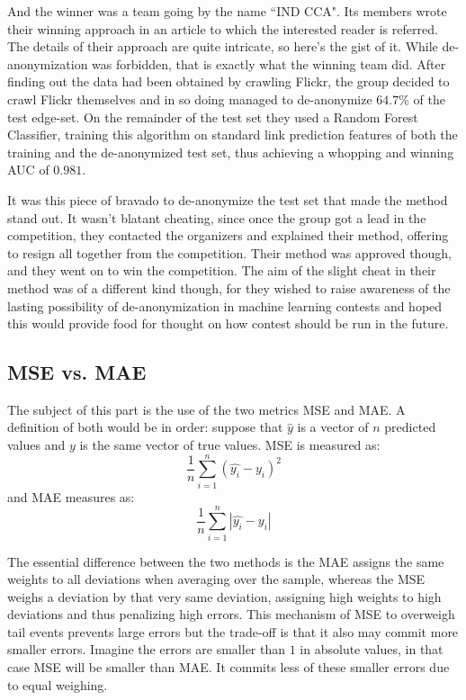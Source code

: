 \documentclass[english, a4paper]{article}
\begin{document}
And the winner was a team going by the name ``IND CCA". Its members wrote their winning approach in an article \cite{6033446} to which the interested reader is referred. The details of their approach are quite intricate, so here's the gist of it. While de-anonymization was forbidden, that is exactly what the winning team did. After finding out the data had been obtained by crawling Flickr, the group decided to crawl Flickr themselves and in so doing managed to de-anonymize $64.7 \%$ of the test edge-set. On the remainder of the test set they used a Random Forest Classifier, training this algorithm on standard link prediction features of both the training and the de-anonymized test set, thus achieving a whopping and winning AUC of $0.981$.

It was this piece of bravado to de-anonymize the test set that made the method stand out. It wasn't blatant cheating, since once the group got a lead in the competition, they contacted the organizers and explained their method, offering to resign all together from the competition. Their method was approved though, and they went on to win the competition. The aim of the slight cheat in their method was of a different kind though, for they wished to raise awareness of the lasting possibility of de-anonymization in machine learning contests and hoped this would provide food for thought on how contest should be run in the future.

\subsection{MSE vs. MAE}
The subject of this part is the use of the two metrics MSE and MAE. A definition of both would be in order: suppose that $\hat{y}$ is a vector of $n$ predicted values and $y$ is the same vector of true values. MSE is measured as:
$$
\frac{1}{n}\sum_{i=1}^{n}(\hat{y_{i}} - y_{i})^{2}
$$  
and MAE measures as:
$$
\frac{1}{n}\sum_{i=1}^{n}|\hat{y_{i}}-y_{i}|
$$

\noindent The essential difference between the two methods is the MAE assigns the same weights to all deviations when averaging over the sample, whereas the MSE weighs a deviation by that very same deviation, assigning high weights to high deviations and thus penalizing high errors. This mechanism of MSE to overweigh tail events prevents large errors but the trade-off is that it also may commit more smaller errors. Imagine the errors are smaller than $1$ in absolute values, in that case MSE will be smaller than MAE. It commits less of these smaller errors due to equal weighing.
\end{document}

